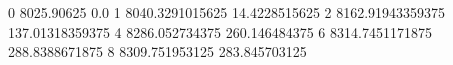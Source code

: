 0 8025.90625 0.0
1 8040.3291015625 14.4228515625
2 8162.91943359375 137.01318359375
4 8286.052734375 260.146484375
6 8314.7451171875 288.8388671875
8 8309.751953125 283.845703125
